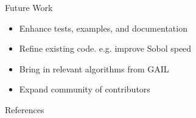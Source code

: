 \documentclass[final]{beamer}
\newlength{\onecolwid}
\begin{document}
\begin{frame}[t]
\begin{columns}[t]
\begin{column}{\onecolwid}
\vspace{-.9in}
\begin{block}{Future Work}
    \begin{itemize}
        \item Enhance tests, examples, and documentation
        \item Refine existing code. e.g. improve Sobol speed
        \item Bring in relevant algorithms from GAIL~\cite{ChoEtal19}
        \item Expand community of contributors
    \end{itemize}
\end{block}

\vspace{-.5in}
\begin{block}{References}

\nocite{*} %
\small{  %
}

\end{block}

\end{column}
\end{columns}
\end{frame}
\end{document}
